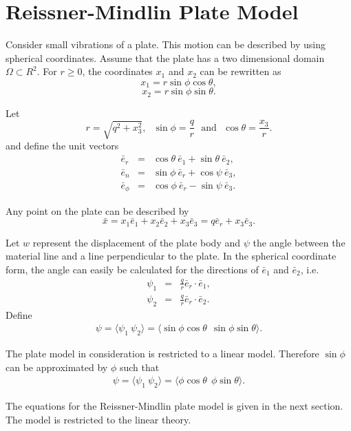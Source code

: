 \documentclass[../../main.tex]{subfiles}
\begin{document}
	\section{Reissner-Mindlin Plate Model} \label{sec:P_Model}
	Consider small vibrations of a plate. This motion can be described by using spherical coordinates. Assume that the plate has a two dimensional domain $\Omega \subset R^2$. For $r \geq 0$, the coordinates $x_1$ and $x_2$ can be rewritten as
	\[ x_1 = r \sin \phi \cos \theta, \]
	\[ x_2 = r \sin \phi \sin \theta. \]
	
	Let
	\[ r = \sqrt{q^2 + x_3^2},~~~\sin \phi = \frac{q}{r}~~~\textrm{and}~~~\cos \theta = \frac{x_3}{r}.\]
	and define the unit vectors
	\begin{eqnarray*}
		\bar e_r &=& \cos \theta ~\bar e_1 + \sin \theta ~\bar e_2,\\
		\bar e_n &=& \sin \phi~\bar e_r + \cos \psi~\bar e_3, \\
		\bar e_\phi &=& \cos \phi~\bar e_r - \sin \psi~\bar e_3.
	\end{eqnarray*}
	
	Any point on the plate can be described by
	\[ \bar{x} = x_1 \bar e_1 + x_2 \bar e_2 + x_3 \bar e_3 = q \bar e_r + x_3 \bar e_3. \] \label{sym:en}
	
	
	Let $w$ represent the displacement of the plate body and $\psi$ the angle between the material line and a line perpendicular to the plate. In the spherical coordinate form, the angle can easily be calculated for the directions of $\bar{e}_1$ and $\bar{e}_2$, i.e.
	\begin{eqnarray*}
		\psi_1 & = & \frac{q}{r} \bar{e}_r \cdot \bar{e}_1, \\
		\psi_2 & = & \frac{q}{r} \bar{e}_r \cdot \bar{e}_2.
	\end{eqnarray*}
	Define
	\begin{eqnarray*}
		{\psi} = \langle \psi_1 \  \psi_2\rangle = \langle \sin\phi \cos \theta \ \ \sin\phi \sin \theta\rangle.
	\end{eqnarray*}
	
	The plate model in consideration is restricted to a linear model. Therefore $\sin\phi$ can be approximated by $\phi$ such that
	\begin{eqnarray*}
		{\psi} = \langle \psi_1 \  \psi_2\rangle = \langle \phi \cos \theta \ \ \phi \sin \theta \rangle.
	\end{eqnarray*}
	
	The equations for the Reissner-Mindlin plate model is given in the next section. The model is restricted to the linear theory.
	
\end{document}
